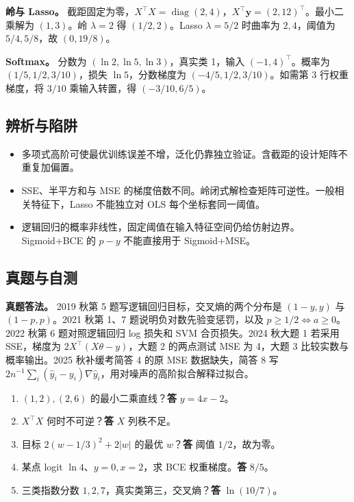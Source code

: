 \documentclass[UTF8,a4paper,zihao=-4,fontset=fandol]{ctexart}
\begin{document}
\textbf{岭与 Lasso。} 截距固定为零，\(X^\top X=\operatorname{diag}(2,4)\)，\(X^\top\bm y=(2,12)^\top\)。最小二乘解为 \((1,3)\)。岭 \(\lambda=2\) 得 \((1/2,2)\)。Lasso \(\lambda=5/2\) 时曲率为 \(2,4\)，阈值为 \(5/4,5/8\)，故 \((0,19/8)\)。
 
\textbf{Softmax。} 分数为 \((\ln2,\ln5,\ln3)\)，真实类 1，输入 \((-1,4)^\top\)。概率为 \((1/5,1/2,3/10)\)，损失 \(\ln5\)，分数梯度为 \((-4/5,1/2,3/10)\)。如需第 3 行权重梯度，将 \(3/10\) 乘输入转置，得 \((-3/10,6/5)\)。

\subsection{辨析与陷阱}
\begin{itemize}[nosep,leftmargin=*]
\item 多项式高阶可使最优训练误差不增，泛化仍靠独立验证。含截距的设计矩阵不重复加偏置。
\item SSE、半平方和与 MSE 的梯度倍数不同。岭闭式解检查矩阵可逆性。一般相关特征下，Lasso 不能独立对 OLS 每个坐标套同一阈值。
\item 逻辑回归的概率非线性，固定阈值在输入特征空间仍给仿射边界。Sigmoid+BCE 的 \(p-y\) 不能直接用于 Sigmoid+MSE。
\end{itemize}

\subsection{真题与自测}
\textbf{真题答法。} 2019 秋第 5 题写逻辑回归目标，交叉熵的两个分布是 \((1-y,y)\) 与 \((1-p,p)\)。2021 秋第 1、7 题说明负对数先验变惩罚，以及 \(p\ge1/2\Leftrightarrow a\ge0\)。2022 秋第 6 题对照逻辑回归 log 损失和 SVM 合页损失。2024 秋大题 1 若采用 SSE，梯度为 \(2X^\top(X\theta-y)\)，大题 2 的两点测试 MSE 为 4，大题 3 比较实数与概率输出。2025 秋补缓考简答 4 的原 MSE 数据缺失，简答 8 写 \(2n^{-1}\sum_i(\hat y_i-y_i)\nabla\hat y_i\)，用对噪声的高阶拟合解释过拟合。
\begin{enumerate}[nosep,leftmargin=*]
\item \((1,2),(2,6)\) 的最小二乘直线？\textbf{答} \(y=4x-2\)。
\item \(X^\top X\) 何时不可逆？\textbf{答} \(X\) 列秩不足。
\item 目标 \(2(w-1/3)^2+2|w|\) 的最优 \(w\)？\textbf{答} 阈值 \(1/2\)，故为零。
\item 某点 logit \(\ln4\)、\(y=0,x=2\)，求 BCE 权重梯度。\textbf{答} \(8/5\)。
\item 三类指数分数 \(1,2,7\)，真实类第三，交叉熵？\textbf{答} \(\ln(10/7)\)。
\end{enumerate}
\end{document}
